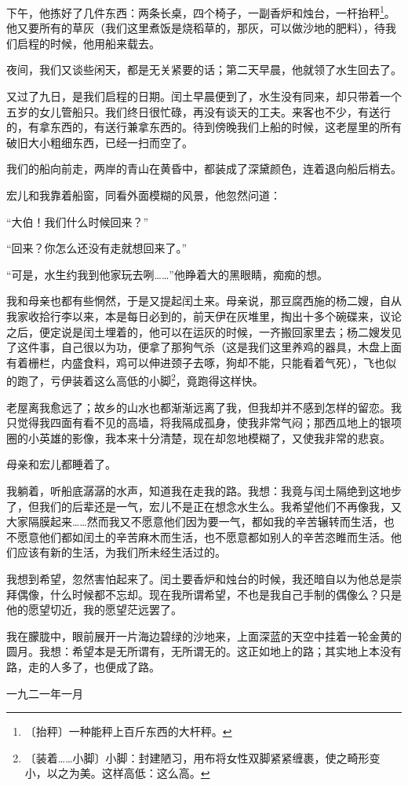 \documentclass[12pt,UTF-8,openany]{ctexbook}
\begin{document}
\begin{normalsize}
    下午，他拣好了几件东西：两条长桌，四个椅子，一副香炉和烛台，一杆抬秤\footnote{〔抬秤〕一种能秤上百斤东西的大杆秤。}。他又要所有的草灰（我们这里煮饭是烧稻草的，那灰，可以做沙地的肥料），待我们启程的时候，他用船来载去。
    
    夜间，我们又谈些闲天，都是无关紧要的话；第二天早晨，他就领了水生回去了。
    
    又过了九日，是我们启程的日期。闰土早晨便到了，水生没有同来，却只带着一个五岁的女儿管船只。我们终日很忙碌，再没有谈天的工夫。来客也不少，有送行的，有拿东西的，有送行兼拿东西的。待到傍晚我们上船的时候，这老屋里的所有破旧大小粗细东西，已经一扫而空了。
    
    我们的船向前走，两岸的青山在黄昏中，都装成了深黛颜色，连着退向船后梢去。
    
    宏儿和我靠着船窗，同看外面模糊的风景，他忽然问道：
    
    “大伯！我们什么时候回来？”
    
    “回来？你怎么还没有走就想回来了。”
    
    “可是，水生约我到他家玩去咧……”他睁着大的黑眼睛，痴痴的想。
    
    我和母亲也都有些惘然，于是又提起闰土来。母亲说，那豆腐西施的杨二嫂，自从我家收拾行李以来，本是每日必到的，前天伊在灰堆里，掏出十多个碗碟来，议论之后，便定说是闰土埋着的，他可以在运灰的时候，一齐搬回家里去；杨二嫂发见了这件事，自己很以为功，便拿了那狗气杀（这是我们这里养鸡的器具，木盘上面有着栅栏，内盛食料，鸡可以伸进颈子去啄，狗却不能，只能看着气死），飞也似的跑了，亏伊装着这么高低的小脚\footnote{〔装着……小脚〕小脚：封建陋习，用布将女性双脚紧紧缠裹，使之畸形变小，以之为美。这样高低：这么高。}，竟跑得这样快。
    
    老屋离我愈远了；故乡的山水也都渐渐远离了我，但我却并不感到怎样的留恋。我只觉得我四面有看不见的高墙，将我隔成孤身，使我非常气闷；那西瓜地上的银项圈的小英雄的影像，我本来十分清楚，现在却忽地模糊了，又使我非常的悲哀。
    
    母亲和宏儿都睡着了。
    
    我躺着，听船底潺潺的水声，知道我在走我的路。我想：我竟与闰土隔绝到这地步了，但我们的后辈还是一气，宏儿不是正在想念水生么。我希望他们不再像我，又大家隔膜起来……然而我又不愿意他们因为要一气，都如我的辛苦辗转而生活，也不愿意他们都如闰土的辛苦麻木而生活，也不愿意都如别人的辛苦恣睢而生活。他们应该有新的生活，为我们所未经生活过的。
    
    我想到希望，忽然害怕起来了。闰土要香炉和烛台的时候，我还暗自以为他总是崇拜偶像，什么时候都不忘却。现在我所谓希望，不也是我自己手制的偶像么？只是他的愿望切近，我的愿望茫远罢了。
    
    我在朦胧中，眼前展开一片海边碧绿的沙地来，上面深蓝的天空中挂着一轮金黄的圆月。我想：希望本是无所谓有，无所谓无的。这正如地上的路；其实地上本没有路，走的人多了，也便成了路。
    
    \hfill 一九二一年一月
    
\end{normalsize}
\end{document}
